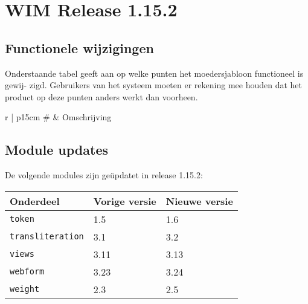 

\newcommand{\release}{1.15.2}
\newcommand{\projectname}{WIM Release \release}

\newcommand{\customer}{Dimpact} %
\newcommand{\customershort}{Dimpact} %

\newcommand{\customerdomain}{dimpact.nl}
\newcommand{\authors}{R. Meijer}
\newcommand{\lastversion}{1.0}
\newcommand{\lastupdate}{18-05-2016}






\tableofcontents
\pagebreak



\section{\projectname} %
\label{sec:release}


\subsection{Functionele wijzigingen} %
\label{sub:functionele_wijzigingen}

Onderstaande tabel geeft aan op welke punten het moedersjabloon functioneel is gewij- zigd. Gebruikers van het systeem moeten er rekening mee houden dat het product op deze punten anders werkt dan voorheen.

\begin{tabular}{ r | p{15cm} } \hline
  \# & Omschrijving \\ \hline
\end{tabular}




\subsection{Module updates} %
\label{sub:module_updates}

De volgende modules zijn ge\"updatet in release \release:

\begin{tabularx}{\linewidth}{X|l|l} \hline
  Onderdeel & Vorige versie & Nieuwe versie \\ \hline
  \texttt{token} & 1.5 & 1.6 \\ \hline
  \texttt{transliteration} & 3.1 & 3.2 \\ \hline
  \texttt{views} & 3.11 & 3.13 \\ \hline
  \texttt{webform} & 3.23 & 3.24 \\ \hline
  \texttt{weight} & 2.3 & 2.5 \\ \hline
\end{tabularx}





